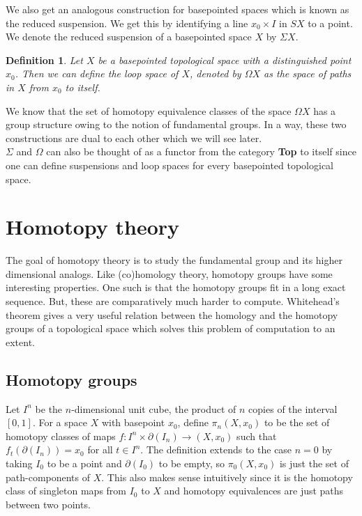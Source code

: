\documentclass[12pt]{extarticle}
\numberwithin{equation}{section}
\newtheorem{defn}[thm]{Definition}
\begin{document}
We also get an analogous construction for basepointed spaces which is known as the reduced suspension. We get this by identifying a line $x_0\times I$ in $SX$ to a point. We denote the reduced suspension of a basepointed space $X$ by $\Sigma X$.

\begin{defn}
Let $X$ be a basepointed topological space with a distinguished point $x_0$. Then we can define the loop space of $X$, denoted by $\Omega X$ as the space of paths in $X$ from $x_0$ to itself.
\end{defn}

We know that the set of homotopy equivalence classes of the space $\Omega X$ has a group structure owing to the notion of fundamental groups. In a way, these two constructions are dual to each other which we will see later.\\

$\Sigma$ and $\Omega$ can also be thought of as a functor from the category \textbf{Top} to itself since one can define suspensions and loop spaces for every basepointed topological space. 

\section{Homotopy theory}

The goal of homotopy theory is to study the fundamental group and its higher dimensional analogs. Like (co)homology theory, homotopy groups have some interesting properties. One such is that the homotopy groups fit in a long exact sequence. But, these are comparatively much harder to compute. Whitehead's theorem gives a very useful relation between the homology and the homotopy groups of a topological space which solves this problem of computation to an extent.\\


\subsection{Homotopy groups}

Let $I^n$ be the $n$-dimensional unit cube, the product of $n$ copies of the interval
$[0,1]$. For a space $X$ with basepoint $x_0$, define $\pi_n(X,x_0)$
to be the set of homotopy classes of maps $f:I^n\times \partial(I_n) \to (X,x_0)$ such that $f_t(\partial(I_n))=x_0$ for all $t\in I^n$. The definition extends to the case
$n = 0$ by taking $I_0$ to be a point and $\partial(I_0)$ to be empty, so $\pi_0(X,x_0)$ is just the set of
path-components of $X$. This also makes sense intuitively since it is the homotopy class of singleton maps from $I_0$ to $X$ and homotopy equivalences are just paths between two points.\\
\end{document}
